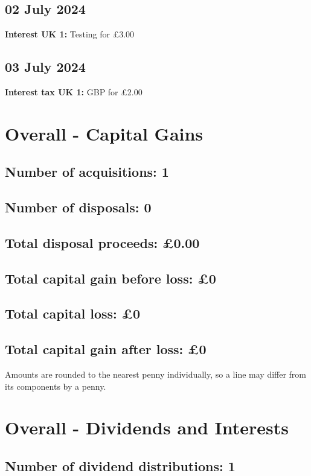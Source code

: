 \documentclass{article}
\begin{document}
\subsection*{02 July 2024}
\textbf{Interest UK 1:} Testing for £3.00



\subsection*{03 July 2024}
\textbf{Interest tax UK 1:} GBP for £2.00



\clearpage
\section*{Overall - Capital Gains}
\subsection*{Number of acquisitions: 1}
\subsection*{Number of disposals: 0}
\subsection*{Total disposal proceeds: £0.00}
\subsection*{Total capital gain before loss: £0}
\subsection*{Total capital loss: £0}
\subsection*{Total capital gain after loss: £0}
\vspace{1em}
Amounts are rounded to the nearest penny individually, so a line may differ from its components by a penny.
\vspace{2em}
\section*{Overall - Dividends and Interests}
\subsection*{Number of dividend distributions: 1}
\end{document}
